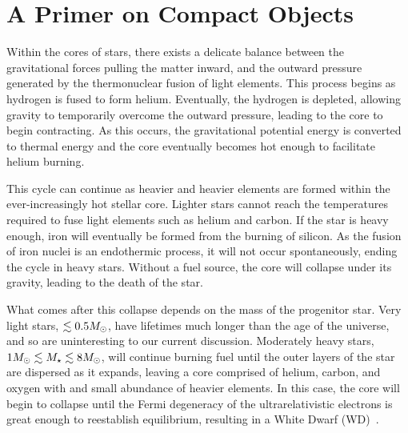 \graphicspath{{img/compact_objects/}}



\chapter{A Primer on Compact Objects}
\label{chapter:compactobjects}


Within the cores of stars, there exists a delicate balance between the gravitational forces pulling the matter inward, and the outward pressure generated by the thermonuclear fusion of light elements. This process begins as hydrogen is fused to form helium. Eventually, the hydrogen is depleted, allowing gravity to temporarily overcome the outward pressure, leading to the core to begin contracting. As this occurs, the gravitational potential energy is converted to thermal energy and the core eventually becomes hot enough to facilitate helium burning. 

This cycle can continue as heavier and heavier elements are formed within the ever-increasingly hot stellar core. Lighter stars cannot reach the temperatures required to fuse light elements such as helium and carbon. If the star is heavy enough, iron will eventually be formed from the burning of silicon. As the fusion of iron nuclei is an endothermic process, it will not occur spontaneously, ending the cycle in heavy stars. Without a fuel source, the core will collapse under its gravity, leading to the death of the star.

What comes after this collapse depends on the mass of the progenitor star. Very light stars, $\lesssim 0.5 M_\odot$, have lifetimes much longer than the age of the universe, and so are uninteresting to our current discussion. Moderately heavy stars, $1M_\odot\lesssim M_\star \lesssim 8M_\odot$, will continue burning fuel until the outer layers of the star are dispersed as it expands, leaving a core comprised of helium, carbon, and oxygen with and small abundance of heavier elements. In this case, the core will begin to collapse until the Fermi degeneracy of the ultrarelativistic electrons is great enough to reestablish equilibrium, resulting in a White Dwarf (WD)~\cite{Jackson:2004vt_Compactobjectseveryone}.


